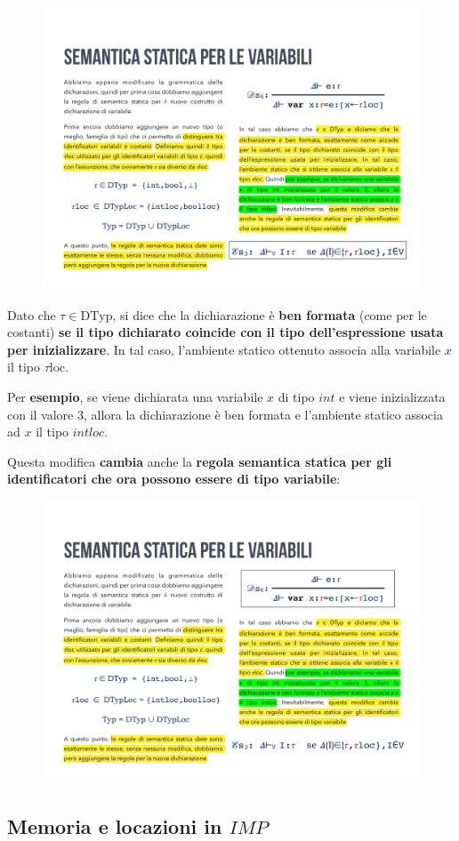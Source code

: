 \documentclass[a4paper]{article}
\begin{document}
	\begin{figure}[!htp]
		\centering
		\includegraphics[width=.5\textwidth]{img/semantica_statica-agg-6.pdf}
	\end{figure}

	\noindent
 	Dato che $\tau \in \mathrm{DTyp}$, si dice che la dichiarazione è \textbf{ben formata} (come per le costanti) \textbf{se il tipo dichiarato coincide con il tipo dell'espressione usata per inizializzare}. In tal caso, l'ambiente statico ottenuto associa alla variabile $x$ il tipo $\tau \mathrm{loc}$.\newline
 	
 	\noindent
 	Per \textcolor{Green4}{\textbf{esempio}}, se viene dichiarata una variabile $x$ di tipo $int$ e viene inizializzata con il valore $3$, allora la dichiarazione è ben formata e l'ambiente statico associa ad $x$ il tipo $intloc$.\newline
 	
 	\noindent
 	Questa modifica \textbf{cambia} anche la \textbf{regola semantica statica per gli identificatori che ora possono essere di tipo variabile}:
 	
 	\begin{figure}[!htp]
 		\centering
 		\includegraphics[width=.6\textwidth]{img/semantica_statica-agg-7.pdf}
 	\end{figure}\newpage
 
 	\subsection{Memoria e locazioni in $IMP$}
 	
\end{document}
